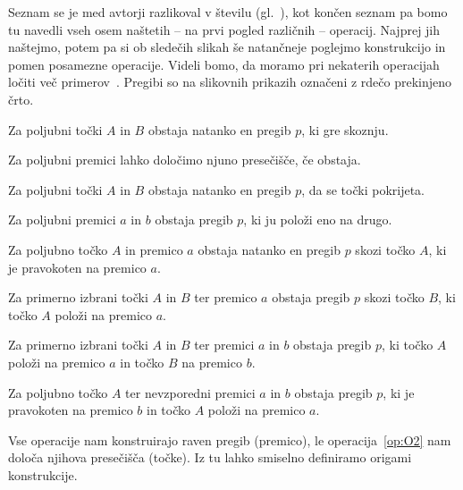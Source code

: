 Seznam se je med avtorji razlikoval v številu (gl.\ \cite[str.\ 29--30]{hull2020}), kot končen seznam pa bomo tu navedli vseh osem naštetih -- na prvi pogled različnih -- operacij. Najprej jih naštejmo, potem pa si ob sledečih slikah še natančneje poglejmo konstrukcijo in pomen posamezne operacije. Videli bomo, da moramo pri nekaterih operacijah ločiti več primerov~\cite{michael2005, zore2022}. Pregibi so na slikovnih prikazih označeni z rdečo prekinjeno črto.

\renewcommand{\theoperacija}{O\arabic{operacija}}

\begin{operacija}
    \label{op:O1}
    Za poljubni točki $A$ in $B$ obstaja natanko en pregib $p$, ki gre skoznju.
\end{operacija}
\begin{operacija}
    \label{op:O2}
    Za poljubni premici lahko določimo njuno presečišče, če obstaja.
\end{operacija}
\begin{operacija}
    \label{op:O3}
    Za poljubni točki $A$ in $B$ obstaja natanko en pregib $p$, da se točki pokrijeta.
\end{operacija}
\begin{operacija}
    \label{op:O4}
    Za poljubni premici $a$ in $b$ obstaja pregib $p$, ki ju položi eno na drugo.
\end{operacija}
\begin{operacija}
    \label{op:O5}
    Za poljubno točko $A$ in premico $a$ obstaja natanko en pregib $p$ skozi točko $A$, ki je pravokoten na premico $a$.
\end{operacija}
\begin{operacija}
    \label{op:O6}
    Za primerno izbrani točki $A$ in $B$ ter premico $a$ obstaja pregib $p$ skozi točko $B$, ki točko $A$ položi na premico $a$.
\end{operacija}
\begin{operacija}
    \label{op:O7}
    Za primerno izbrani točki $A$ in $B$ ter premici $a$ in $b$ obstaja pregib $p$, ki točko $A$ položi na premico $a$ in točko $B$ na premico $b$.
\end{operacija}
\begin{operacija}
    \label{op:O8}
    Za poljubno točko $A$ ter nevzporedni premici $a$ in $b$ obstaja pregib $p$, ki je pravokoten na premico $b$ in točko $A$ položi na premico $a$.
\end{operacija}

Vse operacije nam konstruirajo raven pregib (premico), le operacija~\ref{op:O2} nam določa njihova presečišča (točke). Iz tu lahko smiselno definiramo origami konstrukcije.

